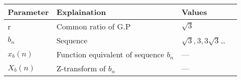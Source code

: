 \begin{table}[ht]
    \begin{tabular}{ | >{\centering\arraybackslash}m{2cm} | >{\centering\arraybackslash}m{3cm} | >{\centering\arraybackslash}m{2.3cm} | @{}m{0pt}@{} }
    \hline
    \textbf{Parameter} & \textbf{Explaination} & \textbf{Values} &\\[10pt]
    \hline
    r & Common ratio of G.P & $\sqrt{3}$ &\\[10pt]
    \hline
    $b_n$ & Sequence & $\sqrt{3}, 3, 3\sqrt{3}$\dots &\\[10pt] 
    \hline
    $x_b(n)$ & Function equivalent of sequence $b_n$ & --- &\\[10pt]
    \hline 
    $X_b(n)$ & Z-transform of $b_n$ & --- &\\[10pt]
    \hline 
    \end{tabular}
    \begin{center}
    \end{center}
\end{table}